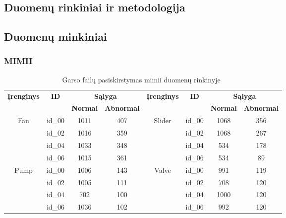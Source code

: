 \subsection*{Duomenų rinkiniai ir metodologija}\label{chap:twolt}
\subsection*{Duomenų minkiniai}
\subsubsection*{MIMII}
\begin{table}[!ht]
	\centering
	\caption[Garso failų pasiskirstymas MIMII duomenų rinkinyje]{Garso failų pasiskirstymas \gls{mimii} duomenų rinkinyje~\citep{Purohit2019}}
	\label{tab:mimii_datasetslt}
	\renewcommand{\arraystretch}{1.2}
	\small
	\begin{tabular}{|c|c|c|c|c|c|c|c|}
		\hline
		\multirow{2}{*}{\textbf{Įrenginys}} & \multirow{2}{*}{\textbf{ID}} & \multicolumn{2}{c|}{\textbf{Sąlyga}}&\multirow{2}{*}{\textbf{Įrenginys}} & \multirow{2}{*}{\textbf{ID}} & \multicolumn{2}{c|}{\textbf{Sąlyga}}\\
		\cline{3-4}
		\cline{7-8}
		&&\textbf{Normal} & \textbf{Abnormal}&&&\textbf{Normal} & \textbf{Abnormal}\\
		\hline
		\multirow{4}{*}{Fan} & id\_00 & 1011 & 407&\multirow{4}{*}{Slider} & id\_00 & 1068 & 356\\
		\cline{2-4}
		\cline{6-8}
		& id\_02 & 1016& 359&& id\_02 & 1068 & 267\\
		\cline{2-4}
		\cline{6-8}
		& id\_04 & 1033 & 348&& id\_04 & 534 & 178\\
		\cline{2-4}
		\cline{6-8}
		& id\_06 & 1015 &361&& id\_06 & 534 & 89\\
		\hline
		\multirow{4}{*}{Pump} & id\_00 & 1006 & 143&\multirow{4}{*}{Valve} & id\_00 & 991 & 119\\
		\cline{2-4}
		\cline{6-8}
		& id\_02 & 1005 & 111&& id\_02 & 708 & 120\\
		\cline{2-4}
		\cline{6-8}
		& id\_04 & 702 & 100&& id\_04 & 1000 & 120\\
		\cline{2-4}
		\cline{6-8}
		& id\_06 & 1036 & 102&& id\_06 & 992 & 120\\
		\hline
	\end{tabular}
\end{table}
